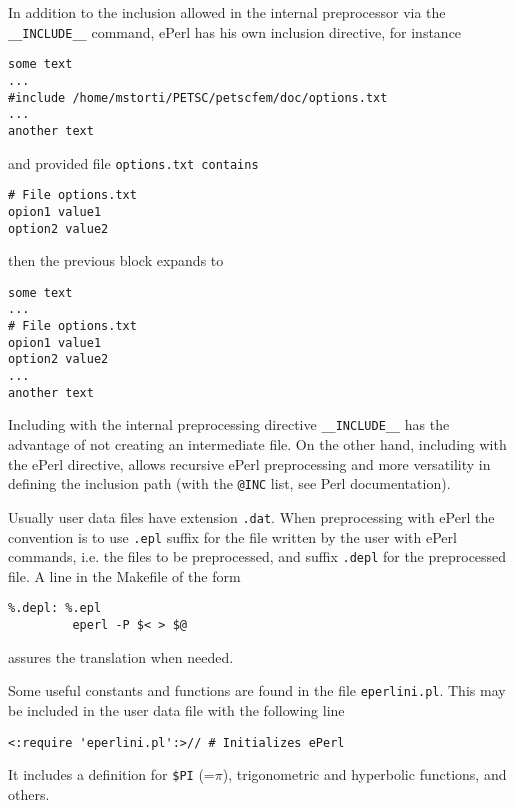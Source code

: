 
%
In addition to the inclusion allowed in the internal preprocessor via
the \verb+__INCLUDE__+ command, ePerl has his own inclusion directive,
for instance
%
\begin{verbatim}
some text
...
#include /home/mstorti/PETSC/petscfem/doc/options.txt
...
another text
\end{verbatim}
%
and provided file \verb+options.txt contains+ 
%
\begin{verbatim}
# File options.txt
opion1 value1
option2 value2
\end{verbatim}
%
then the previous block expands to
%
\begin{verbatim}
some text
...
# File options.txt
opion1 value1
option2 value2
...
another text
\end{verbatim}
%
Including with the internal preprocessing directive \verb+__INCLUDE__+
has the advantage of not creating an intermediate file. On the other
hand, including with the ePerl directive, allows recursive ePerl
preprocessing and more versatility in defining the inclusion path
(with the \verb+@INC+ list, see Perl documentation). 


%
Usually user data files have extension \verb+.dat+. When preprocessing
with ePerl the convention is to use \verb+.epl+ suffix for the file
written by the user with ePerl commands, i.e. the files to be
preprocessed, and suffix \verb+.depl+ for the preprocessed file. 
A line in the Makefile of the form
%
\begin{verbatim}
%.depl: %.epl
         eperl -P $< > $@
\end{verbatim}
%
assures the translation when needed. 


Some useful constants and functions are found in the file
\verb+eperlini.pl+. This may be included in the user data file with
the following line

\begin{verbatim}
<:require 'eperlini.pl':>// # Initializes ePerl 
\end{verbatim}

It includes a definition for {\tt \$PI} (=$\pi$), trigonometric and
hyperbolic functions, and others. 


